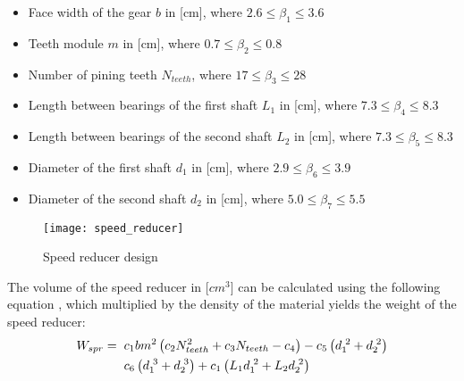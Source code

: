 \begin{itemize}
\item Face width of the gear $b$ in [cm], 
where $2.6 \leq β_{1} \leq 3.6$ 
\item Teeth module $m$ in [cm], where $0.7\leq β_{2}\leq 0.8$
\item Number of pining teeth $N_{teeth}$,
where $17 \leq β_{3} \leq 28$
\item Length between bearings of the first shaft $L_{1}$ in 
[cm], where $7.3 \leq β_{4} \leq 8.3$ 
\item Length between bearings of the second shaft $L_{2}$ in 
[cm], where $7.3 \leq β_{5} \leq 8.3$ 
\item Diameter of the first shaft $d_{1}$ in [cm],
where $2.9 \leq β_{6} \leq 3.9$ 
\item Diameter of the second shaft $d_{2}$ in [cm],
where $5.0 \leq β_{7} \leq 5.5$ 
\end{itemize}

\begin{figure}[h!]
\centering
\texttt{[image: speed\_reducer]}   
\caption{Speed reducer design} 
\label{fig:speed_reducer_image}
\end{figure}

\newpage


The volume of the speed reducer in [$cm^{3}$] can be 
calculated using the following equation \cite{speed reducer}, 
which multiplied by the density of the material yields the 
weight of the speed reducer:
\begin{equation}
\begin{split}
W_{spr} = \hspace{2mm} &  c_{1}bm^{2} \left( c_{2} 
N_{teeth}^{2} + c_{3} N_{teeth} - c_{4} \right) - c_{5}
\left( d_{1}^{\hspace{1mm}2} + d_{2}^{\hspace{1mm}2} \right) 
\\ &
c_{6} \left( d_{1}^{\hspace{1mm}3} + d_{2}^{\hspace{1mm}3} 
\right) + c_{1} \left( L_{1}d_{1}^{\hspace{1mm}2} 
+ L_{2}d_{2}^{\hspace{1mm}2} \right)
\end{split} 
\end{equation}

